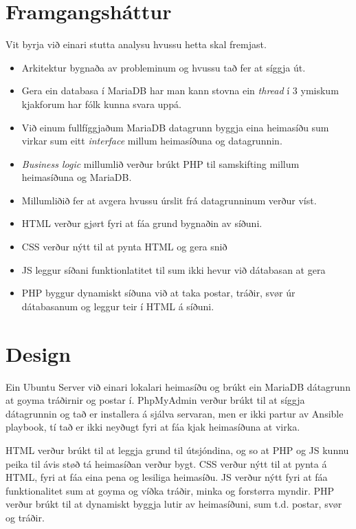 \documentclass{article}
\begin{document}
\section{Framgangsháttur}
\par Vit byrja við einari stutta analysu hvussu hetta skal fremjast.
\begin{itemize}
    \item Arkitektur bygnaða av probleminum og hvussu tað fer at síggja út.
    \item Gera ein databasa í MariaDB har man kann stovna ein \textit{thread} í 3 ymiskum kjakforum har fólk kunna svara uppá.
    \item Við einum fullfíggjaðum MariaDB datagrunn byggja eina heimasíðu sum virkar sum eitt \textit{interface} millum heimasíðuna og datagrunnin.
    \item \textit{Business logic} millumlið verður brúkt PHP til samskifting millum
            \newline heimasíðuna og MariaDB.
    \item Millumliðið fer at avgera hvussu úrslit frá datagrunninum verður víst.    
\end{itemize}

\begin{itemize}
    \item HTML verður gjørt fyri at fáa grund bygnaðin av síðuni.
    \item CSS verður nýtt til at pynta HTML og gera snið
    \item JS leggur síðani funktionlatitet til sum ikki hevur við dátabasan at gera
    \item PHP byggur dynamiskt síðuna við at taka postar, tráðir, svør úr dátabasanum
og leggur teir í HTML á síðuni.
\end{itemize}


\section{Design}
\par Ein Ubuntu Server við einari lokalari heimasíðu og brúkt ein MariaDB dátagrunn
at goyma tráðirnir og postar í.
PhpMyAdmin verður brúkt til at síggja dátagrunnin og tað er installera á sjálva servaran,
men er ikki partur av Ansible playbook, tí tað er ikki neyðugt fyri at fáa kjak heimasíðuna
at virka.
\par HTML verður brúkt til at leggja grund til útsjóndina, og so at PHP og JS kunnu peika
til ávis støð tá heimasíðan verður bygt. CSS verður nýtt til at pynta á HTML, fyri at fáa eina
pena og lesiliga heimasíðu. JS verður nýtt fyri at fáa funktionalitet sum at goyma og víðka
tráðir, minka og forstørra myndir. PHP verður brúkt til at dynamiskt byggja lutir av
heimasíðuni, sum t.d. postar, svør og tráðir. 
\end{document}
